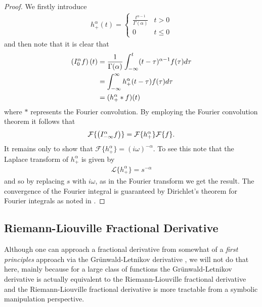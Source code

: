 \begin{proof}
    We firstly introduce
    \begin{align*}
        h_+^\alpha(t) = \begin{cases}
            \frac{t^{\alpha-1}}{\Gamma(\alpha)} & t > 0 \\
            0   & t \leq 0
        \end{cases} 
    \end{align*} and then note that it is clear that
    \begin{align*}
        \left( I_{0}^{\alpha} f \right)(t) &= \frac{1}{\Gamma(\alpha)} \int_{-\infty}^t (t-\tau)^{\alpha-1} f(\tau)d\tau \\
            &= \int_{-\infty}^\infty h_+^\alpha(t-\tau)f(\tau)d\tau \\
            &= (h_+^\alpha * f)(t)
    \end{align*}
    where $ * $ represents the Fourier convolution.
    By employing the Fourier convolution theorem it follows that
    \begin{align*}
         \mathcal{F}\{ \left( I_{-\infty}^{\alpha} f \right) \} = \mathcal{F}\{ h_+^\alpha \}\mathcal{F}\{f\}.
    \end{align*}
    It remains only to show that $ \mathcal{F}\{h_+^\alpha\} = (i\omega)^{-\alpha} $. To see this note that the Laplace transform of $ h_+^\alpha $ is given by
    \begin{align*}
        \mathcal{L}\{h_+^\alpha\} = s^{-\alpha} 
    \end{align*}
    and so by replacing $ s $ with $ i\omega $, as in the Fourier transform we get the result. The convergence of the Fourier integral is guaranteed by Dirichlet's theorem for Fourier integrals as noted in \cite{Podlubny1999}. 
\end{proof}
\subsection{Riemann-Liouville Fractional Derivative}
Although one can approach a fractional derivative from somewhat of a \emph{first principles} approach via the Gr{\"u}nwald-Letnikov derivative \cite{Podlubny1999, Samko1993}, we will not do that here, mainly because for a large class of functions the Gr{\"u}nwald-Letnikov derivative is actually equivalent to the Riemann-Liouville fractional derivative \cite{Podlubny1999} and the Riemann-Liouville fractional derivative is more tractable from a symbolic manipulation perspective.

